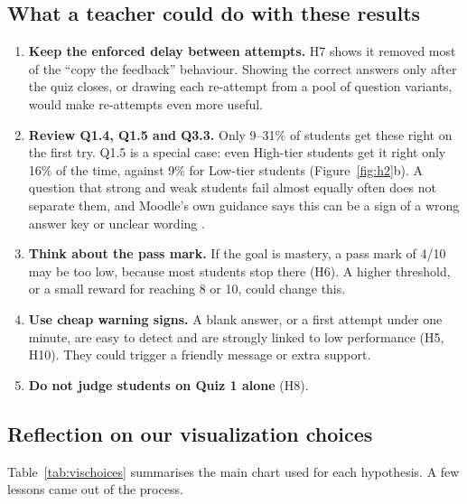 \subsection{What a teacher could do with these results}

\begin{enumerate}
  \item \textbf{Keep the enforced delay between attempts.} H7 shows it removed
        most of the ``copy the feedback'' behaviour. Showing the correct
        answers only after the quiz closes, or drawing each re-attempt from a
        pool of question variants, would make re-attempts even more useful.
  \item \textbf{Review Q1.4, Q1.5 and Q3.3.} Only 9--31\% of students get
        these right on the first try. Q1.5 is a special case: even High-tier
        students get it right only 16\% of the time, against 9\% for Low-tier
        students (Figure~\ref{fig:h2}b). A question that strong and weak
        students fail almost equally often does not separate them, and Moodle's
        own guidance says this can be a sign of a wrong answer key or unclear
        wording \citep{moodle_stats}.
  \item \textbf{Think about the pass mark.} If the goal is mastery, a pass mark
        of 4/10 may be too low, because most students stop there (H6). A
        higher threshold, or a small reward for reaching 8 or 10, could change
        this.
  \item \textbf{Use cheap warning signs.} A blank answer, or a first attempt
        under one minute, are easy to detect and are strongly linked to low
        performance (H5, H10). They could trigger a friendly message or extra
        support.
  \item \textbf{Do not judge students on Quiz 1 alone} (H8).
\end{enumerate}

\subsection{Reflection on our visualization choices}

Table~\ref{tab:vischoices} summarises the main chart used for each hypothesis.
A few lessons came out of the process.

